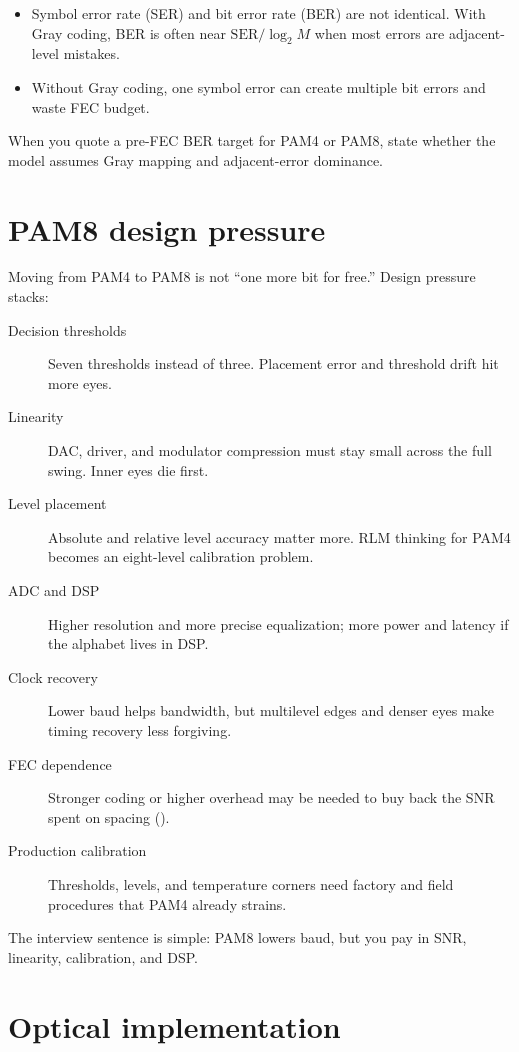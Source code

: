\begin{itemize}
\item Symbol error rate (SER) and bit error rate (BER) are not identical. With
      Gray coding, BER is often near \(\mathrm{SER}/\log_2 M\) when most errors
      are adjacent-level mistakes.
\item Without Gray coding, one symbol error can create multiple bit errors and
      waste FEC budget.
\end{itemize}

When you quote a pre-FEC BER target for PAM4 or PAM8, state whether the model
assumes Gray mapping and adjacent-error dominance.

\section{PAM8 design pressure}
\label{sec:pam8-pressure}

Moving from PAM4 to PAM8 is not ``one more bit for free.'' Design pressure
stacks:

\begin{description}
\item[Decision thresholds] Seven thresholds instead of three. Placement error
      and threshold drift hit more eyes.
\item[Linearity] DAC, driver, and modulator compression must stay small across
      the full swing. Inner eyes die first.
\item[Level placement] Absolute and relative level accuracy matter more. RLM
      thinking for PAM4 becomes an eight-level calibration problem.
\item[ADC and DSP] Higher resolution and more precise equalization; more power
      and latency if the alphabet lives in DSP.
\item[Clock recovery] Lower baud helps bandwidth, but multilevel edges and
      denser eyes make timing recovery less forgiving.
\item[FEC dependence] Stronger coding or higher overhead may be needed to buy
      back the SNR spent on spacing ().
\item[Production calibration] Thresholds, levels, and temperature corners need
      factory and field procedures that PAM4 already strains.
\end{description}

The interview sentence is simple: PAM8 lowers baud, but you pay in SNR,
linearity, calibration, and DSP.

\section{Optical implementation}
\label{sec:multilevel-optical}

